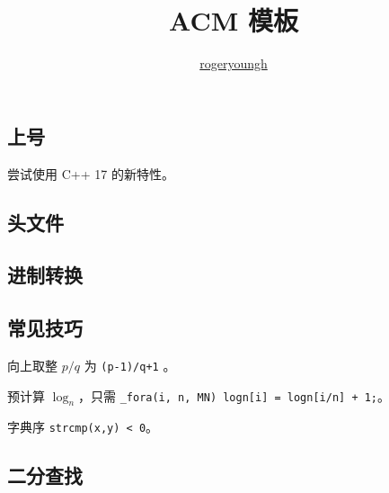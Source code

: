 \documentclass{probook}
\title{ACM 模板}
\author{\href{https://github.com/rogeryoungh}{rogeryoungh}}
\begin{document}
\newcommand\mfrac[2]{\dfrac{#1\smash[b]{\strut}}{#2\smash[t]{\strut}}}
\newcommand\ee{\mathrm{e}}
\newcommand\dd{\mathrm{d}}
\newcommand\uppi{\mathrm{\pi}}

\newcommand{\lcm}{\operatorname{lcm}}
\newcommand{\DFT}{\operatorname{DFT}_{\omega_n}}
\newcommand{\Id}{\operatorname{Id}}

\maketitle

\frontmatter

\columnseprule=2pt
\setlength{\columnsep}{30pt}
\begin{multicols}{2}

\tableofcontents

\mainmatter






\chapter{上号}

尝试使用 C++ 17 的新特性。

\section{头文件}



\section{进制转换}



\section{常见技巧}

向上取整 $p/q$ 为 \lstinline[style=cpp]{(p-1)/q+1} 。

预计算 $\log_n$，只需 \lstinline[style=cpp]{_fora(i, n, MN) logn[i] = logn[i/n] + 1;}。

字典序 \lstinline[style=cpp]{strcmp(x,y) < 0}。

\section{二分查找}


\end{multicols}
\end{document}
